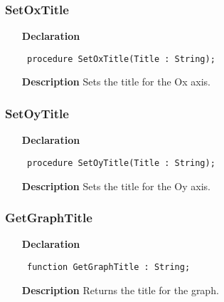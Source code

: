 \documentclass[12pt,a4paper,oneside]{report}
\newcommand{\declarationitem}[1]{\textbf{#1}}
\newcommand{\descriptiontitle}[1]{\textbf{#1}}
\newcommand{\code}[1]{\texttt{#1}}
\begin{document}
\subsubsection{SetOxTitle}
\label{uwinplot-SetOxTitle}
\begin{itemize}\item[\declarationitem{Declaration}\hfill]
	\begin{flushleft}
		\code{
			procedure SetOxTitle(Title : String);}
		
	\end{flushleft}
	
	\par
	\item[\descriptiontitle{Description}]
	Sets the title for the Ox axis.
	
\end{itemize}
\subsubsection{SetOyTitle}
\label{uwinplot-SetOyTitle}
\begin{itemize}\item[\declarationitem{Declaration}\hfill]
	\begin{flushleft}
		\code{
			procedure SetOyTitle(Title : String);}
		
	\end{flushleft}
	
	\par
	\item[\descriptiontitle{Description}]
	Sets the title for the Oy axis.
	
\end{itemize}
\subsubsection{GetGraphTitle}
\label{uwinplot-GetGraphTitle}
\begin{itemize}\item[\declarationitem{Declaration}\hfill]
	\begin{flushleft}
		\code{
			function GetGraphTitle : String;}
		
	\end{flushleft}
	
	\par
	\item[\descriptiontitle{Description}]
	Returns the title for the graph.
	
\end{itemize}
\end{document}
